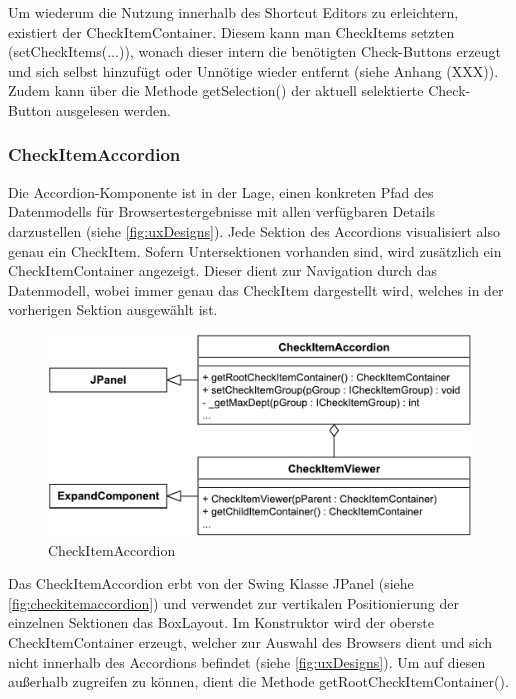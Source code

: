 Um wiederum die Nutzung innerhalb des Shortcut Editors zu erleichtern, existiert der CheckItemContainer. Diesem kann man CheckItems setzten (setCheckItems(...)), wonach dieser intern die benötigten Check-Buttons erzeugt und sich selbst hinzufügt oder Unnötige wieder entfernt (siehe Anhang (XXX)). Zudem kann über die Methode getSelection() der aktuell selektierte Check-Button ausgelesen werden.

\subsubsection{CheckItemAccordion}

Die Accordion-Komponente ist in der Lage, einen konkreten Pfad des Datenmodells für Browsertestergebnisse mit allen verfügbaren Details darzustellen (siehe \autoref{fig:uxDesigns}).
Jede Sektion des Accordions visualisiert also genau ein CheckItem. Sofern Untersektionen vorhanden sind, wird zusätzlich ein CheckItemContainer angezeigt. Dieser dient zur Navigation durch das Datenmodell, wobei immer genau das CheckItem dargestellt wird, welches in der vorherigen Sektion ausgewählt ist.

\begin{figure}
	\vspace{-12px}
	\centering
	\includegraphics[width=0.95\linewidth]{../graphic/diagrams/CD_CheckItemAccordion/CheckItemAccordion}
	\caption{CheckItemAccordion}
	\label{fig:checkitemaccordion}
\end{figure}


Das CheckItemAccordion erbt von der Swing Klasse JPanel (siehe \autoref{fig:checkitemaccordion}) und verwendet zur vertikalen Positionierung der einzelnen Sektionen das BoxLayout. Im Konstruktor wird der oberste CheckItemContainer erzeugt, welcher zur Auswahl des Browsers dient und sich nicht innerhalb des Accordions befindet (siehe \autoref{fig:uxDesigns}). Um auf diesen außerhalb zugreifen zu können, dient die Methode getRootCheckItemContainer().

